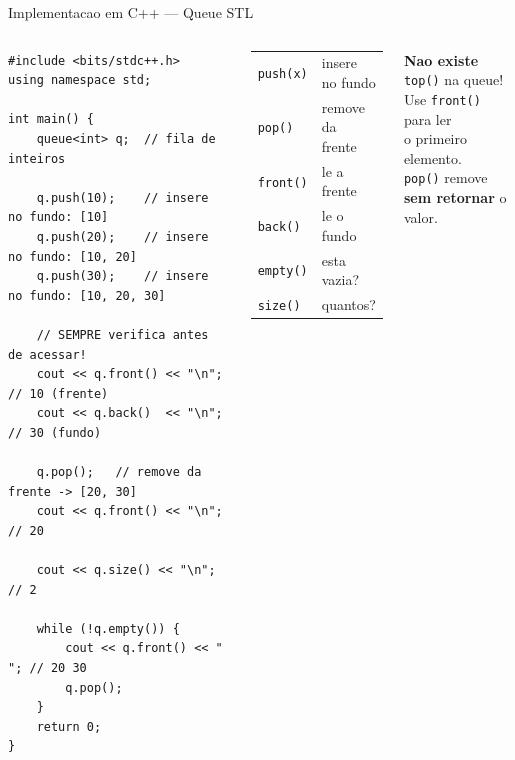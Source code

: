 \documentclass[aspectratio=169,11pt]{beamer}
\begin{document}
\begin{frame}[fragile,shrink=5]{Implementacao em C++ --- Queue STL}
  \begin{columns}[t]
      \begin{tcolorbox}[caixaCodigo]
        \begin{lstlisting}[style=cppstyle]
#include <bits/stdc++.h>
using namespace std;

int main() {
    queue<int> q;  // fila de inteiros

    q.push(10);    // insere no fundo: [10]
    q.push(20);    // insere no fundo: [10, 20]
    q.push(30);    // insere no fundo: [10, 20, 30]

    // SEMPRE verifica antes de acessar!
    cout << q.front() << "\n"; // 10 (frente)
    cout << q.back()  << "\n"; // 30 (fundo)

    q.pop();   // remove da frente -> [20, 30]
    cout << q.front() << "\n"; // 20

    cout << q.size() << "\n";  // 2

    while (!q.empty()) {
        cout << q.front() << " "; // 20 30
        q.pop();
    }
    return 0;
}
        \end{lstlisting}
      \end{tcolorbox}
      \vspace{0.1cm}
      \begin{tcolorbox}[caixaAzul,title={Resumo STL}]
        \footnotesize
        \begin{tabular}{@{}ll@{}}
          \texttt{push(x)}  & insere no fundo\\[3pt]
          \texttt{pop()}    & remove da frente\\[3pt]
          \texttt{front()}  & le a frente\\[3pt]
          \texttt{back()}   & le o fundo\\[3pt]
          \texttt{empty()}  & esta vazia?\\[3pt]
          \texttt{size()}   & quantos?\\
        \end{tabular}
      \end{tcolorbox}
      \vspace{0.2cm}
      \begin{tcolorbox}[caixaVermelho,title={Atencao}]
        \footnotesize
        \textbf{Nao existe} \texttt{top()} na queue!\\[3pt]
        Use \texttt{front()} para ler\\
        o primeiro elemento.\\[3pt]
        \texttt{pop()} remove\\
        \textbf{sem retornar} o valor.
      \end{tcolorbox}
  \end{columns}
\end{frame}
\end{document}
